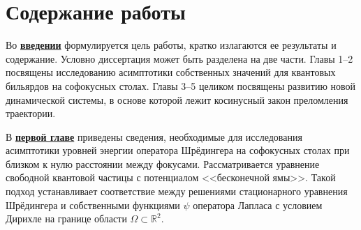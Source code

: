 \section*{Содержание работы}
Во \underline{\textbf{введении}} формулируется цель работы, кратко излагаются ее результаты и содержание. 
Условно диссертация может быть разделена на две части. Главы 1--2 посвящены исследованию асимптотики собственных значений для квантовых бильярдов на софокусных столах. Главы 3--5 целиком посвящены развитию новой динамической системы, в основе которой лежит косинусный закон преломления траектории.


В \underline{\textbf{первой главе}} приведены сведения, необходимые для исследования асимптотики уровней энергии оператора Шрёдингера на софокусных столах при близком к нулю расстоянии между фокусами.
Рассматривается уравнение свободной квантовой частицы с потенциалом <<бесконечной ямы>>. Такой подход устанавливает соответствие между  решениями стационарного уравнения Шрёдингера и собственными  функциями $\psi$ оператора Лапласа с условием Дирихле на границе области $\Omega \subset \mathbb{R}^2$.

